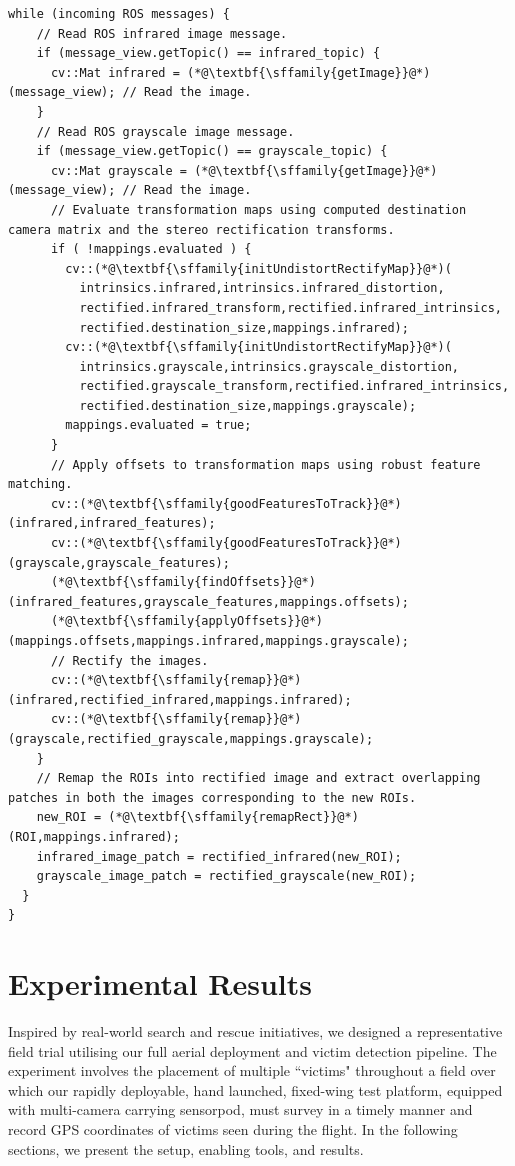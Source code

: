 \documentclass[runningheads]{llncs}
\begin{document}
\begin{lstlisting}[caption=Pseudo source code for Image fusion, label=pseudo, frame=single]
  while (incoming ROS messages) {
    // Read ROS infrared image message.
    if (message_view.getTopic() == infrared_topic) {
      cv::Mat infrared = (*@\textbf{\sffamily{getImage}}@*)(message_view); // Read the image.
    }
    // Read ROS grayscale image message.
    if (message_view.getTopic() == grayscale_topic) {
      cv::Mat grayscale = (*@\textbf{\sffamily{getImage}}@*)(message_view); // Read the image.
      // Evaluate transformation maps using computed destination camera matrix and the stereo rectification transforms.
      if ( !mappings.evaluated ) {
        cv::(*@\textbf{\sffamily{initUndistortRectifyMap}}@*)(
          intrinsics.infrared,intrinsics.infrared_distortion, 
          rectified.infrared_transform,rectified.infrared_intrinsics, 
          rectified.destination_size,mappings.infrared);
        cv::(*@\textbf{\sffamily{initUndistortRectifyMap}}@*)(
          intrinsics.grayscale,intrinsics.grayscale_distortion,
          rectified.grayscale_transform,rectified.infrared_intrinsics,
          rectified.destination_size,mappings.grayscale);
        mappings.evaluated = true;
      }
      // Apply offsets to transformation maps using robust feature matching.
      cv::(*@\textbf{\sffamily{goodFeaturesToTrack}}@*)(infrared,infrared_features);
      cv::(*@\textbf{\sffamily{goodFeaturesToTrack}}@*)(grayscale,grayscale_features);
      (*@\textbf{\sffamily{findOffsets}}@*)(infrared_features,grayscale_features,mappings.offsets);
      (*@\textbf{\sffamily{applyOffsets}}@*)(mappings.offsets,mappings.infrared,mappings.grayscale);    
      // Rectify the images.
      cv::(*@\textbf{\sffamily{remap}}@*)(infrared,rectified_infrared,mappings.infrared);
      cv::(*@\textbf{\sffamily{remap}}@*)(grayscale,rectified_grayscale,mappings.grayscale);
    }
    // Remap the ROIs into rectified image and extract overlapping patches in both the images corresponding to the new ROIs.
    new_ROI = (*@\textbf{\sffamily{remapRect}}@*)(ROI,mappings.infrared);
    infrared_image_patch = rectified_infrared(new_ROI);
    grayscale_image_patch = rectified_grayscale(new_ROI);
  }
}
\end{lstlisting}


\section{Experimental Results}

Inspired by real-world search and rescue initiatives, we designed a representative field trial utilising our full aerial deployment and victim detection pipeline. The experiment involves the placement of multiple ``victims" throughout a field over which our rapidly deployable, hand launched, fixed-wing test platform, equipped with multi-camera carrying sensorpod, must survey in a timely manner and record GPS coordinates of victims seen during the flight. In the following sections, we present the setup, enabling tools, and results.
\end{document}
